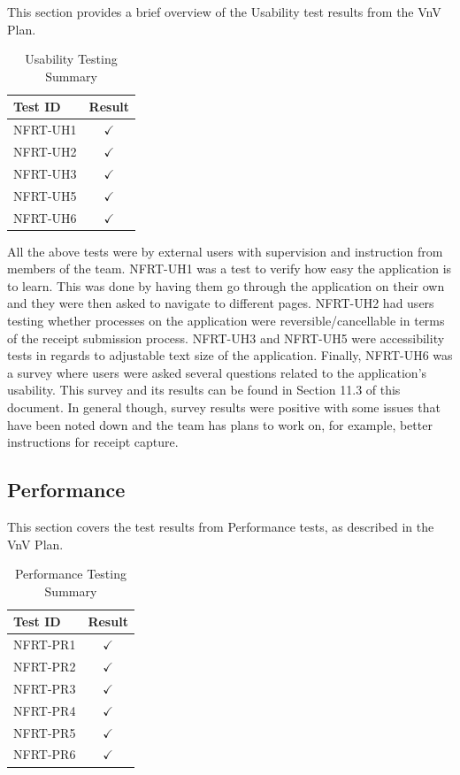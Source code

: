 \documentclass[12pt, titlepage]{article}
\begin{document}
This section provides a brief overview of the Usability test results from the VnV Plan.

\begin{longtable}{|l|c|}
  \caption{Usability Testing Summary} \label{Usability Testing Summary} \\
  \toprule
  \textbf{Test ID} & \textbf{Result} \\
  \midrule
  NFRT-UH1 & $\checkmark$ \\
  \midrule
  NFRT-UH2 & $\checkmark$ \\
  \midrule
  NFRT-UH3 & $\checkmark$ \\
  \midrule
  NFRT-UH5 & $\checkmark$ \\
  \midrule
  NFRT-UH6 & $\checkmark$ \\
  \bottomrule
\end{longtable}

All the above tests were by external users with supervision and instruction from members of the team. NFRT-UH1 was a test
to verify how easy the application is to learn. This was done by having them go through the application on their own
and they were then asked to navigate to different pages. NFRT-UH2 had users testing whether processes on the
application were reversible/cancellable in terms of the receipt submission process. NFRT-UH3 and NFRT-UH5 were
accessibility tests in regards to adjustable text size of the application. Finally, NFRT-UH6 was a survey where users
were asked several questions related to the application's usability. This survey and its results can be found
in Section 11.3 of this document. In general though, survey results were positive with some issues that have been noted down and
the team has plans to work on, for example, better instructions for receipt capture.

\subsection{Performance}

This section covers the test results from Performance tests, as described in the VnV Plan.

\begin{longtable}{|l|c|}
  \caption{Performance Testing Summary} \label{Performance Testing Summary} \\
  \toprule
  \textbf{Test ID} & \textbf{Result} \\
  \midrule
  NFRT-PR1 & $\checkmark$ \\
  \midrule
  NFRT-PR2 & $\checkmark$ \\
  \midrule
  NFRT-PR3 & $\checkmark$ \\
  \midrule
  NFRT-PR4 & $\checkmark$ \\
  \midrule
  NFRT-PR5 & $\checkmark$ \\
  \midrule
  NFRT-PR6 & $\checkmark$ \\
  \bottomrule
\end{longtable}
\end{document}
